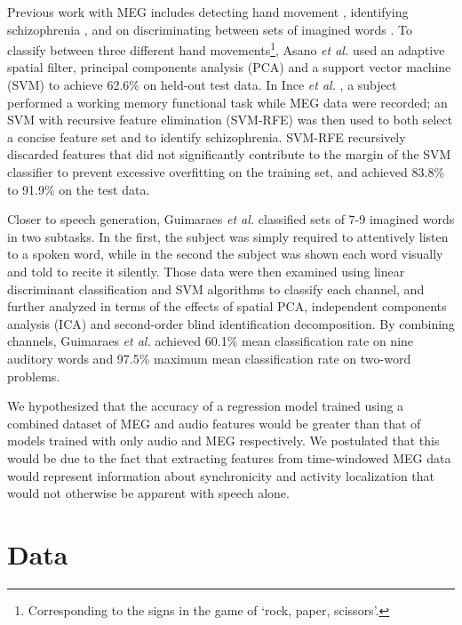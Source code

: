 \documentclass[a4paper]{article}
\begin{document}
Previous work with MEG includes detecting hand movement \cite{Asano2009}, identifying schizophrenia \cite{Ince2008}, and on discriminating between sets of imagined words \cite{Guimaraes2007}. To classify between three different hand movements\footnote{Corresponding to the signs in the game of `rock, paper, scissors'.}, Asano {\em et al.} \cite{Asano2009} used an adaptive spatial filter, principal components analysis (PCA) and a support vector machine (SVM) to achieve 62.6\% on held-out test data. In Ince {\em et al.} \cite{Ince2008}, a subject performed a working memory functional task while MEG data were recorded; an SVM with recursive feature elimination (SVM-RFE) was then used to both select a concise feature set and to identify schizophrenia. SVM-RFE recursively discarded features that did not significantly contribute to the margin of the SVM classifier to prevent excessive overfitting on the training set, and achieved 83.8\% to 91.9\% on the test data.

Closer to speech generation, Guimaraes {\em et al.} \cite{Guimaraes2007} classified sets of 7-9 imagined words in two subtasks. In the first, the subject was simply required to attentively listen to a spoken word, while in the second the subject was shown each word visually and told to recite it
silently. Those data were then examined using linear discriminant classification and SVM algorithms to classify each
channel, and further analyzed in terms of the effects of spatial PCA, independent components analysis (ICA) and second-order
blind identification decomposition. By combining channels, Guimaraes {\em et al.} achieved 60.1\% mean classification
rate on nine auditory words and 97.5\% maximum mean classification rate on two-word problems.


We hypothesized that the accuracy of a regression model trained using a combined dataset of MEG and audio features would be greater than that of models trained with only audio and MEG respectively. We postulated that this would be due to the fact that extracting features from time-windowed MEG data would represent information about synchronicity and activity localization that would not otherwise be apparent with speech alone.

\section{Data}
\end{document}
